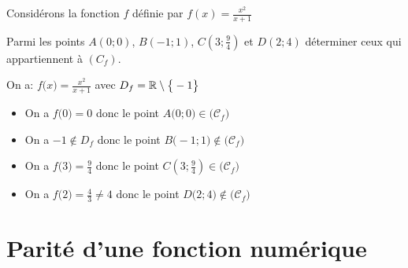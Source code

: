 \documentclass[10pt, a4paper]{article}
\begin{document}
\begin{Application}[][30 min]
\noindent
Considérons la fonction $f$ définie par $f(x) = \frac{x^2}{x+1}$

Parmi les points $A(0;0)$, $B(-1;1)$, $C\left(3;\frac{9}{4}\right)$ et $D(2;4)$ 
déterminer ceux qui appartiennent à $(C_f)$.
\end{Application}

\begin{Solution}[APPLICATION][3]
On a: \quad $f\big( x \big) = \frac{x^2}{x+1}$ avec $D_f = \mathbb{R} \setminus \big\{ -1 \big\}$

\begin{itemize}[leftmargin=*,itemsep=0.5pt]
    \item On a $f\big( 0 \big) = 0$ donc le point $A\big( 0 ; 0 \big) \in \big( \mathcal{C}_f \big)$
    \item On a $-1 \notin D_f$ donc le point $B\big( -1 ; 1 \big) \notin \big( \mathcal{C}_f \big)$
    \item On a $f\big( 3 \big) = \frac{9}{4}$ donc le point $C\left( 3 ; \frac{9}{4} \right) \in \big( \mathcal{C}_f \big)$
    \item On a $f\big( 2 \big) = \frac{4}{3} \neq 4$ donc le point $D\big( 2 ; 4 \big) \notin \big( \mathcal{C}_f \big)$
\end{itemize}
\end{Solution}

\section{Parité d'une fonction numérique }
\end{document}
